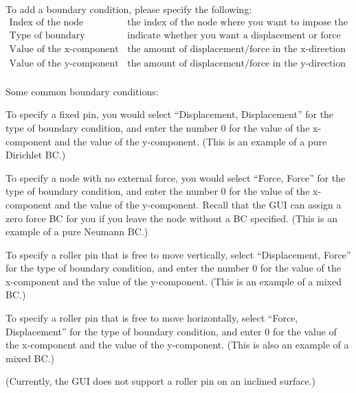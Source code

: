 \documentclass[oneside, english, reqno]{amsart}
\theoremstyle{plain}
\theoremstyle{plain}
\theoremstyle{plain}
\theoremstyle{plain}
\theoremstyle{definition}
\theoremstyle{definition}
\theoremstyle{definition}
\numberwithin{equation}{section}
\begin{document}
To add a boundary condition, please specify the following:
\begin{equation*}
		\begin{array}{ll}
				\mbox{Index of the node} & \mbox{the index of the node where you want to impose the BC} \\[6pt]
				\mbox{Type of boundary condition} & \mbox{indicate whether you want a displacement or force BC} \\[6pt]
				\mbox{Value of the x-component} & \mbox{the amount of displacement/force in the x-direction} \\[6pt]
				\mbox{Value of the y-component} & \mbox{the amount of displacement/force in the y-direction} \\[6pt]
		\end{array}
\end{equation*} \vspace{1pt}

Some common boundary conditions: \vspace{6pt}

To specify a fixed pin, you would select ``Displacement, Displacement'' for the type of boundary condition, and enter the number 0 for the value of the x-component and the value of the y-component. (This is an example of a pure Dirichlet BC.) \vspace{6pt}

To specify a node with no external force, you would select ``Force, Force'' for the type of boundary condition, and enter the number 0 for the value of the x-component and the value of the y-component. Recall that the GUI can assign a zero force BC for you if you leave the node without a BC specified. (This is an example of a pure Neumann BC.) \vspace{6pt}

To specify a roller pin that is free to move vertically, select ``Displacement, Force'' for the type of boundary condition, and enter the number 0 for the value of the x-component and the value of the y-component. (This is an example of a mixed BC.) \vspace{6pt}

To specify a roller pin that is free to move horizontally, select ``Force, Displacement'' for the type of boundary condition, and enter 0 for the value of the x-component and the value of the y-component. (This is also an example of a mixed BC.) \vspace{6pt}

(Currently, the GUI does not support a roller pin on an inclined surface.) \vspace{25pt}
\end{document}
